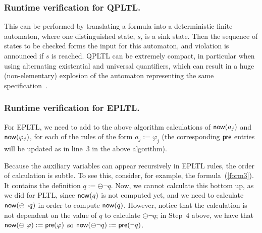 \subsubsection*{Runtime verification for QPLTL.}  This can be performed by translating a
formula into a deterministic finite automaton, where one distinguished state, $s$, is a sink state.
Then the sequence of states to be checked forms the input for this automaton, and violation is
announced if $s$ is reached.
QPLTL can be extremely compact, in particular when using alternating existential and universal 
quantifiers, which can result in a huge (non-elementary) explosion of
the automaton representing the same
specification~\cite{Thomas}.


\subsubsection*{Runtime verification for EPLTL.} For EPLTL,  we need to  add to the above
algorithm calculations 
of $\mathsf{now} ( a_j )$ and
$\mathsf{now} ( \varphi_j )$, for each of the rules of
the form $a_j := \varphi_j$ (the corresponding
$\mathsf{pre}$ entries will be updated as in line~3 in the above algorithm).


Because the
auxiliary variables can appear recursively in EPLTL rules, the order of calculation is
subtle. To see this, consider, for example, the formula~(\ref{form3}). It contains
the definition $q := \ominus \neg q$. Now, we cannot calculate this
bottom up, as we did for PLTL, since $\mathsf{now} ( q )$ is not computed yet, and we need 
to calculate $\mathsf{now} ( \ominus \neg q )$ in order 
to compute $\mathsf{now} ( q )$.
However, notice that the calculation is not dependent on the
value of $q$ to calculate $\ominus \neg q$; 
in Step~4 above, we have that
$\mathsf{now} ( \ominus \; \varphi ) := \mathsf{pre} ( \varphi )$
so  $\mathsf{now} ( \ominus \neg q ) := \mathsf{pre} ( \neg q )$.


